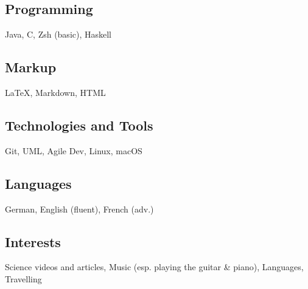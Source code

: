 \documentclass[]{jonas-cv}
\begin{document}
\begin{minipage}[t]{0.34\textwidth}
\tinysectionsep
\subsection{Programming}
Java, C, Zsh (basic), Haskell\\
\sectionsep

\subsection{Markup}
\LaTeX, Markdown, HTML\\
\sectionsep

\subsection{Technologies and Tools}
Git, UML, Agile Dev, Linux, macOS\\
\sectionsep

\subsection{Languages}
German, English (fluent), French (adv.)\\
\sectionsep
\subsection{Interests}
Science videos and articles, Music (esp. playing the guitar \& piano), Languages, Travelling

%
%

\end{minipage} 
\hfill
\end{document}
